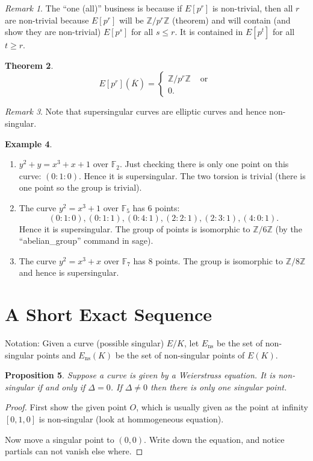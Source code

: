 \documentclass[11pt]{article}
\newcommand{\BB}[1]{\mathbb{#1}} %
\newcommand{\ZZ}{\BB{Z}}
\newcommand{\FF}{\BB{F}}
\newcommand{\ns}{\operatorname{ns}}
\theoremstyle{plain}%
\newtheorem{thm}{Theorem}[section]
\newtheorem{prop}[thm]{Proposition}
\theoremstyle{definition}
\newtheorem{ex}[thm]{Example}
\theoremstyle{remark}
\newtheorem{rem}[thm]{Remark}
\begin{document}
\begin{rem}
	The ``one (all)'' business is because if $E[p^r]$ is non-trivial, then all $r$ are non-trivial because $E[p^r]$ will be $\ZZ/p^r\ZZ$ (theorem) and will contain (and show they are non-trivial) $E[p^s]$ for all $s\leq r$. It is contained in $E[p^t]$ for all $t\geq r$.
\end{rem}

\begin{thm}
	$$
	E[p^r](\overline{K})
	=
	\begin{cases}
		\ZZ/p^r\ZZ &\text{ or }
		\\
		0.
	\end{cases}
	$$
\end{thm}

\begin{rem} %
	Note that supersingular curves are elliptic curves and hence non-singular.
\end{rem}

\begin{ex}
	\hfill
	\begin{enumerate}[$\bullet$]
		\item $y^2+y=x^3+x+1$ over $\FF_2$. Just checking there is only one point on this curve: $(0 : 1 : 0)$. Hence it is supersingular. The two torsion is trivial (there is one point so the group is trivial).
		
		\item The curve $y^2=x^3+1$ over $\FF_5$ has 6 points:
		$$
		(0 : 1 : 0), (0 : 1 : 1), (0 : 4 : 1), (2 : 2 : 1), (2 : 3 : 1), (4 : 0 : 1).
		$$
		Hence it is supersingular. The group of points is isomorphic to $\ZZ/6\ZZ$ (by the ``abelian\_group'' command in sage).
		
		\item The curve $y^2 = x^3 + x$ over $\FF_7$ has 8 points. The group is isomorphic to $\ZZ/8\ZZ$ and hence is supersingular.
	\end{enumerate}
\end{ex}

\section{A Short Exact Sequence}

Notation: Given a curve (possible singular) $E/K$, let $E_{\ns}$ be the set of non-singular points and $E_{\ns}(K)$ be the set of non-singular points of $E(K)$.

\begin{prop} %
	Suppose a curve is given by a Weierstrass equation. It is non-singular if and only if $\Delta=0$. If $\Delta\neq 0$ then there is only one singular point.
\end{prop}
\begin{proof}
	First show the given point $O$, which is usually given as the point at infinity $[0,1,0]$ is non-singular (look at hommogeneous equation).
	
	Now move a singular point to $(0,0)$. Write down the equation, and notice partials can not vanish else where.
\end{proof}
\end{document}
